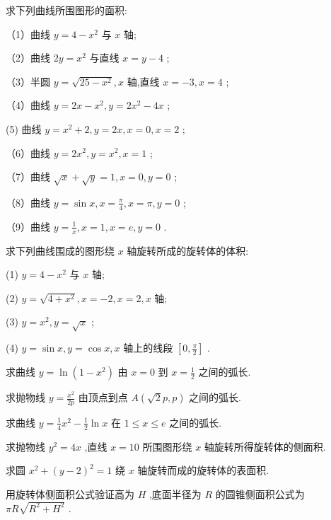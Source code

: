 \documentclass[lang=cn,newtx,12pt,scheme=chinese]{elegantbook}
\begin{document}
\begin{problemset}[习题十六]

\item 求下列曲线所围图形的面积:

（1）曲线 \(y = 4 - {x}^{2}\) 与 \(x\) 轴;

（2）曲线 \({2y} = {x}^{2}\) 与直线 \(x = y - 4\) ;

（3）半圆 \(y = \sqrt{{25} - {x}^{2}},x\) 轴,直线 \(x = - 3,x = 4\) ;

（4）曲线 \(y = {2x} - {x}^{2},y = 2{x}^{2} - {4x}\) ;

(5) 曲线 \(y = {x}^{2} + 2,y = {2x},x = 0,x = 2\) ;

（6）曲线 \(y = 2{x}^{2},y = {x}^{2},x = 1\) ;

（7）曲线 \(\sqrt{x} + \sqrt{y} = 1,x = 0,y = 0\) ;

（8）曲线 \(y = \sin x,x = \frac{\pi }{4},x = \pi ,y = 0\) ;

（9）曲线 \(y = \frac{1}{x},x = 1,x = e,y = 0\) .

\item 求下列曲线围成的图形绕 \(x\) 轴旋转所成的旋转体的体积:

(1) \(y = 4 - {x}^{2}\) 与 \(x\) 轴;

(2) \(y = \sqrt{4 + {x}^{2}},x = - 2,x = 2,x\) 轴;

(3) \(y = {x}^{2},y = \sqrt{x}\) ;

(4) \(y = \sin x,y = \cos x,x\) 轴上的线段 \(\left\lbrack {0,\frac{\pi }{2}}\right\rbrack\) .

\item * 求曲线 \(y = \ln \left( {1 - {x}^{2}}\right)\) 由 \(x = 0\) 到 \(x = \frac{1}{2}\) 之间的弧长.

\item * 求抛物线 \(y = \frac{{x}^{2}}{2p}\) 由顶点到点 \(A\left( {\sqrt{2}p,p}\right)\) 之间的弧长.

\item * 求曲线 \(y = \frac{1}{4}{x}^{2} - \frac{1}{2}\ln x\) 在 \(1 \leq x \leq e\) 之间的弧长.

\item * 求抛物线 \({y}^{2} = {4x}\) ,直线 \(x = {10}\) 所围图形绕 \(x\) 轴旋转所得旋转体的侧面积.

\item * 求圆 \({x}^{2} + {\left( y - 2\right) }^{2} = 1\) 绕 \(x\) 轴旋转而成的旋转体的表面积.

\item * 用旋转体侧面积公式验证高为 \(H\) ,底面半径为 \(R\) 的圆锥侧面积公式为 \({\pi R}\sqrt{{R}^{2} + {H}^{2}}\) .

\end{problemset}
\end{document}
